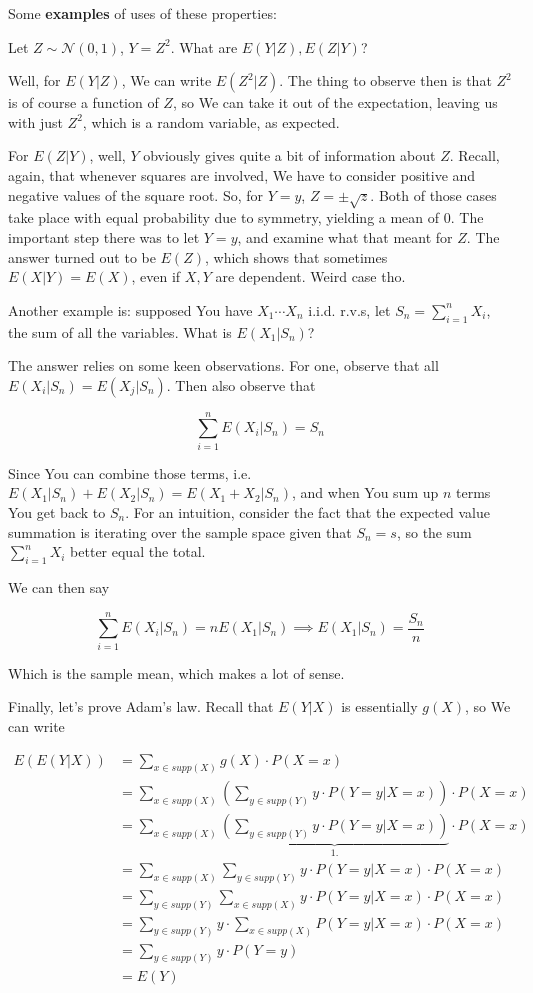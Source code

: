 \documentclass{article}
\begin{document}
		Some \textbf{examples} of uses of these properties:
		
		Let $Z\sim\mathcal{N}(0, 1)$, $Y=Z^2$. What are $E(Y|Z), E(Z|Y)$?
		
		Well, for $E(Y|Z)$, We can write $E(Z^2|Z)$. The thing to observe then is that $Z^2$ is of course a function of $Z$, so We can take it out of the expectation, leaving us with just $Z^2$, which is a random variable, as expected. 
		
		For $E(Z|Y)$, well, $Y$ obviously gives quite a bit of information about $Z$. Recall, again, that whenever squares are involved, We have to consider positive and negative values of the square root. So, for $Y=y$, $Z = \pm \sqrt{z}$. Both of those cases take place with equal probability due to symmetry, yielding a mean of 0. The important step there was to let $Y=y$, and examine what that meant for $Z$. The answer turned out to be $E(Z)$, which shows that sometimes $E(X|Y) = E(X)$, even if $X, Y$ are dependent. Weird case tho.
		
		 Another example is: supposed You have $X_1\cdots X_n$ i.i.d. r.v.s, let $S_n = \sum^n_{i=1} X_i$, the sum of all the variables. What is $E(X_1|S_n)$?

		The answer relies on some keen observations. For one, observe that all $E(X_i|S_n) = E(X_j|S_n)$. Then also observe that
		
		\[ \sum^n_{i=1} E(X_i|S_n) = S_n \]
		
		Since You can combine those terms, i.e. $E(X_1|S_n)+E(X_2|S_n)=E(X_1+X_2|S_n)$, and when You sum up $n$ terms You get back to $S_n$. For an intuition, consider the fact that the expected value summation is iterating over the sample space given that $S_n=s$, so the sum $\sum^n_{i=1} X_i$ better equal the total.
		
		We can then say
		
		\[ \sum^n_{i=1} E(X_i|S_n) = nE(X_1|S_n)\implies E(X_1|S_n) = \frac{S_n}{n} \]
		
		Which is the sample mean, which makes a lot of sense.
		
		Finally, let's prove Adam's law. Recall that $E(Y|X)$ is essentially $g(X)$, so We can write
		
		\begin{align*}
			E(E(Y|X)) &= \sum_{x\in supp(X)} g(X)\cdot P(X=x)\\
			&= \sum_{x\in supp(X)} \left( \sum_{y\in supp(Y)} y\cdot P(Y=y|X=x) \right)\cdot P(X=x) \\
			&= \sum_{x\in supp(X)} \underbrace{\left( \sum_{y\in supp(Y)} y\cdot P(Y=y|X=x) \right)}_{1.}\cdot P(X=x) \\
			&= \sum_{x\in supp(X)}  \sum_{y\in supp(Y)} y\cdot P(Y=y|X=x) \cdot P(X=x) \\			
			&= \sum_{y\in supp(Y)}  \sum_{x\in supp(X)} y\cdot P(Y=y|X=x) \cdot P(X=x) \\
			&= \sum_{y\in supp(Y)} y\cdot \sum_{x\in supp(X)} P(Y=y|X=x) \cdot P(X=x) \\
			&= \sum_{y\in supp(Y)} y\cdot P(Y=y) \\
			&= E(Y)
		\end{align*}
			
\end{document}
